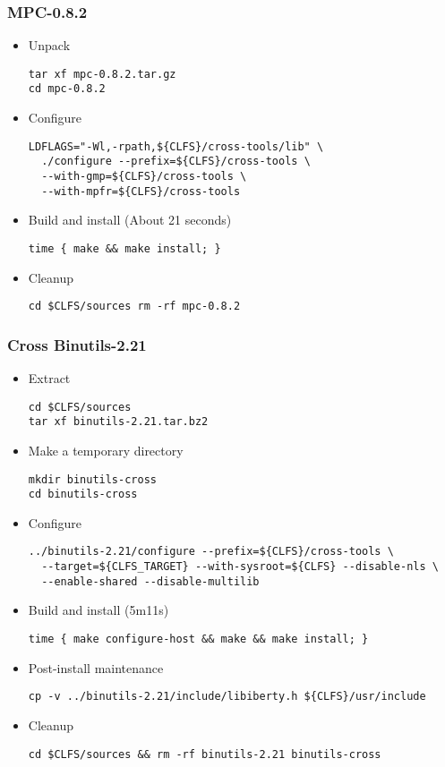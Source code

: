  \subsubsection{MPC-0.8.2}
 \begin{itemize}
  \item Unpack 
   \begin{lstlisting}
tar xf mpc-0.8.2.tar.gz
cd mpc-0.8.2
   \end{lstlisting}
  \item Configure
    \begin{lstlisting}
LDFLAGS="-Wl,-rpath,${CLFS}/cross-tools/lib" \
  ./configure --prefix=${CLFS}/cross-tools \
  --with-gmp=${CLFS}/cross-tools \
  --with-mpfr=${CLFS}/cross-tools
    \end{lstlisting}
  \item Build and install (About 21 seconds)
    \begin{lstlisting}
time { make && make install; }
    \end{lstlisting}
  \item Cleanup
    \begin{lstlisting}
cd $CLFS/sources rm -rf mpc-0.8.2
    \end{lstlisting}
 \end{itemize}

\subsubsection{Cross Binutils-2.21}
\begin{itemize}
  \item Extract
    \begin{lstlisting}
cd $CLFS/sources
tar xf binutils-2.21.tar.bz2
    \end{lstlisting}

  \item Make a temporary directory
    \begin{lstlisting}
mkdir binutils-cross 
cd binutils-cross
    \end{lstlisting}

  \item Configure
    \begin{lstlisting}
../binutils-2.21/configure --prefix=${CLFS}/cross-tools \
  --target=${CLFS_TARGET} --with-sysroot=${CLFS} --disable-nls \
  --enable-shared --disable-multilib
    \end{lstlisting}
  \item Build and install (5m11s)
    \begin{lstlisting}
time { make configure-host && make && make install; }
    \end{lstlisting}
  \item Post-install maintenance
    \begin{lstlisting}
cp -v ../binutils-2.21/include/libiberty.h ${CLFS}/usr/include
    \end{lstlisting}
  \item Cleanup
    \begin{lstlisting}
cd $CLFS/sources && rm -rf binutils-2.21 binutils-cross
    \end{lstlisting}
\end{itemize}


